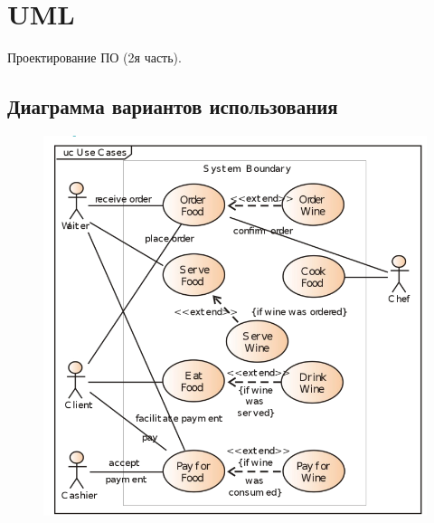 \documentclass[12pt; a4paper]{book}
\begin{document}
\section{UML}
Проектирование ПО (2я часть). 
\subsection{Диаграмма вариантов использования}
\begin{figure}[!hbp]
\includegraphics[angle=0, width=\textwidth]{IMG/1} 
\end{figure}
\newpage
\end{document}
